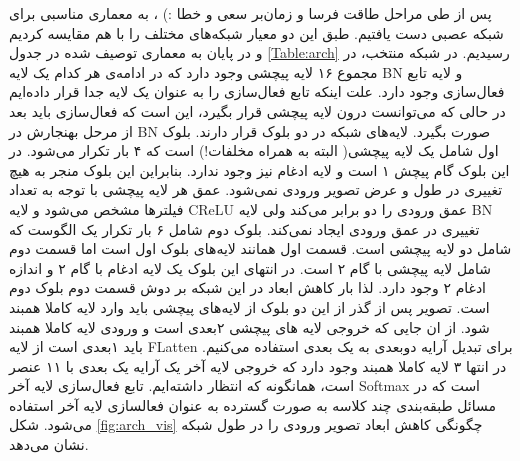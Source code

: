 پس از طی مراحل طاقت فرسا و زمان‌بر سعی و خطا :) ، به معماری مناسبی برای شبکه عصبی دست یافتیم. 
طبق این دو معیار شبکه‌های مختلف را با هم مقایسه کردیم و در پایان به معماری توصیف شده در جدول 
\ref{Table:arch}
رسیدیم. در شبکه منتخب، در مجموع ۱۶ لایه پیچشی وجود دارد که در ادامه‌ی هر کدام یک لایه ‌BN و لایه تابع فعال‌سازی وجود دارد. علت اینکه تابع فعال‌سازی را به عنوان یک لایه جدا قرار داده‌ایم در حالی که می‌توانست درون لایه پیچشی قرار بگیرد، این است که فعال‌سازی باید بعد از مرحل بهنجارش در BN صورت بگیرد. لایه‌های شبکه در دو بلوک قرار دارند. بلوک اول شامل یک لایه پیچشی( البته به همراه مخلفات!) است که ۴ بار تکرار می‌شود. در این بلوک گام پیچش ۱ است و لایه ادغام نیز وجود ندارد. بنابراین این بلوک منجر به هیچ تغییری در طول و عرض تصویر ورودی نمی‌شود. عمق هر لایه پیچشی  با توجه به تعداد فیلترها مشخص می‌شود و لایه CReLU عمق ورودی را دو برابر می‌کند ولی لایه BN تغییری در عمق ورودی ایجاد نمی‌کند. بلوک دوم شامل ۶ بار تکرار یک الگوست که شامل دو لایه پیچشی است. قسمت اول همانند لایه‌های بلوک اول است اما قسمت دوم شامل لایه پیچشی با گام ۲ است. در انتهای این بلوک یک لایه ادغام با گام ۲ و اندازه ادغام ۲ وجود دارد. لذا بار کاهش ابعاد در این شبکه بر دوش قسمت دوم بلوک دوم است. تصویر پس از گذر از این دو بلوک از لایه‌های پیچشی باید وارد لایه کاملا همبند شود. از ان جایی که خروجی لایه های پیچشی ۲بعدی است و ورودی لایه کاملا همبند باید ۱بعدی است از لایه FLatten  برای تبدیل آرایه دوبعدی به یک بعدی استفاده می‌کنیم. در انتها ۳ لایه کاملا همبند وجود دارد که خروجی لایه آخر یک آرایه یک بعدی با ۱۱ عنصر است، همانگونه که انتظار داشته‌ایم. تابع فعال‌سازی لایه آخر Softmax است که در مسائل طبقه‌بندی چند کلاسه به صورت گسترده به عنوان فعالسازی لایه آخر استفاده می‌شود. شکل
\ref{fig:arch_vis}
چگونگی کاهش ابعاد تصویر ورودی را در طول شبکه نشان می‌دهد.        



